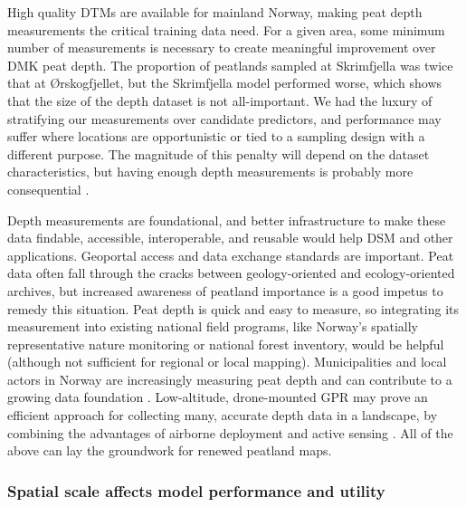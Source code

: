 \documentclass[soil, manuscript]{copernicus}
\begin{document}
High quality DTMs are available for mainland Norway, making peat depth measurements the critical training data need.
For a given area, some minimum number of measurements is necessary to create meaningful improvement over DMK peat depth.
The proportion of peatlands sampled at Skrimfjella was twice that at Ørskogfjellet, but the Skrimfjella model performed worse, which shows that the size of the depth dataset is not all-important.
We had the luxury of stratifying our measurements over candidate predictors, and performance may suffer where locations are opportunistic or tied to a sampling design with a different purpose.
The magnitude of this penalty will depend on the dataset characteristics, but having enough depth measurements is probably more consequential \citep{wadouxSamplingDesignOptimization2019}.

Depth measurements are foundational, and better infrastructure to make these data findable, accessible, interoperable, and reusable would help DSM and other applications.
Geoportal access and data exchange standards \citeyearpar[like Natural England's for peat surveys,][]{naturalenglandDataExchangeStandard2023} are important.
Peat data often fall through the cracks between geology-oriented and ecology-oriented archives, but increased awareness of peatland importance is a good impetus to remedy this situation.
Peat depth is quick and easy to measure, so integrating its measurement into existing national field programs, like Norway's spatially representative nature monitoring or national forest inventory, would be helpful (although not sufficient for regional or local mapping).
Municipalities and local actors in Norway are increasingly measuring peat depth and can contribute to a growing data foundation \citep{kyrkjeeideCalculatorLocalPeatland2023}.
Low-altitude, drone-mounted GPR may prove an efficient approach for collecting many, accurate depth data in a landscape, by combining the advantages of airborne deployment and active sensing \citep{pelletierPeatAnalysesHudson1991, ruolsDevelopmentDronebasedGroundpenetrating2023}.
All of the above can lay the groundwork for renewed peatland maps.

\subsubsection{Spatial scale affects model performance and utility}
\end{document}
